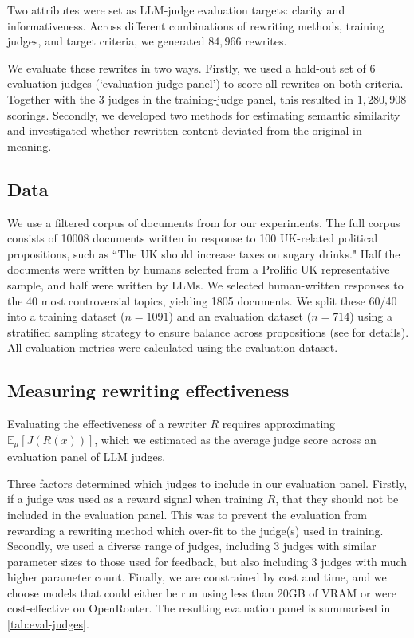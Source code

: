 \documentclass{article}
\begin{document}
Two attributes were set as LLM-judge evaluation targets: clarity and informativeness. Across different combinations of rewriting methods, training judges, and target criteria, we generated $84{,}966$ rewrites.

We evaluate these rewrites in two ways. Firstly, we used a hold-out set of 6 evaluation judges (`evaluation judge panel') to score all rewrites on both criteria. Together with the 3 judges in the training-judge panel, this resulted in $1{,}280{,}908$ scorings. Secondly, we developed two methods for estimating semantic similarity and investigated whether rewritten content deviated from the original in meaning.

\subsection{Data}

We use a filtered corpus of documents from \citet{rottgerQuantifyingDistortiveImpacts2025} for our experiments. The full corpus consists of 10008 documents written in response to 100 UK-related political propositions, such as ``The UK should increase taxes on sugary drinks." Half the documents were written by humans selected from a Prolific UK representative sample, and half were written by LLMs. We selected human-written responses to the 40 most controversial topics, yielding 1805 documents. We split these 60/40 into a training dataset ($n=1091$) and an evaluation dataset ($n=714$) using a stratified sampling strategy to ensure balance across propositions (see  for details). All evaluation metrics were calculated using the evaluation dataset.

\subsection{Measuring rewriting effectiveness}
Evaluating the effectiveness of a rewriter $R$ requires approximating $\mathbb{E}_\mu[J(R(x))]$, which we estimated as the average judge score across an evaluation panel of LLM judges. 

Three factors determined which judges to include in our evaluation panel. Firstly, if a judge was used as a reward signal when training $R$, that they should not be included in the evaluation panel. This was to prevent the evaluation from rewarding a rewriting method which over-fit to the judge(s) used in training. Secondly, we used a diverse range of judges, including 3 judges with similar parameter sizes to those used for feedback, but also including 3 judges with much higher parameter count. Finally, we are constrained by cost and time, and we choose models that could either be run using less than 20GB of VRAM or were cost-effective on OpenRouter. The resulting evaluation panel is summarised in \cref{tab:eval-judges}.
\end{document}
